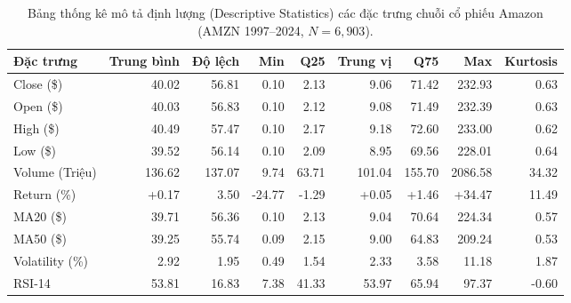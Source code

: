 \documentclass[12pt,a4paper]{report}
\begin{document}
\begin{table}[H]
\centering
\small
\caption{Bảng thống kê mô tả định lượng (Descriptive Statistics) các đặc trưng chuỗi cổ phiếu Amazon (AMZN 1997--2024, $N=6,903$).}
\label{tab:amazon_stats}
\begin{tabularx}{\textwidth}{lrrrrrrrr}
\toprule
\textbf{Đặc trưng} & \textbf{Trung bình} & \textbf{Độ lệch} & \textbf{Min} & \textbf{Q25} & \textbf{Trung vị} & \textbf{Q75} & \textbf{Max} & \textbf{Kurtosis} \\
\midrule
Close (\$) & 40.02 & 56.81 & 0.10 & 2.13 & 9.06 & 71.42 & 232.93 & 0.63 \\
Open (\$) & 40.03 & 56.83 & 0.10 & 2.12 & 9.08 & 71.49 & 232.39 & 0.63 \\
High (\$) & 40.49 & 57.47 & 0.10 & 2.17 & 9.18 & 72.60 & 233.00 & 0.62 \\
Low (\$) & 39.52 & 56.14 & 0.10 & 2.09 & 8.95 & 69.56 & 228.01 & 0.64 \\
Volume (Triệu) & 136.62 & 137.07 & 9.74 & 63.71 & 101.04 & 155.70 & 2086.58 & 34.32 \\
Return (\%) & +0.17 & 3.50 & -24.77 & -1.29 & +0.05 & +1.46 & +34.47 & 11.49 \\
MA20 (\$) & 39.71 & 56.36 & 0.10 & 2.13 & 9.04 & 70.64 & 224.34 & 0.57 \\
MA50 (\$) & 39.25 & 55.74 & 0.09 & 2.15 & 9.00 & 64.83 & 209.24 & 0.53 \\
Volatility (\%) & 2.92 & 1.95 & 0.49 & 1.54 & 2.33 & 3.58 & 11.18 & 1.87 \\
RSI-14 & 53.81 & 16.83 & 7.38 & 41.33 & 53.97 & 65.94 & 97.37 & -0.60 \\
\bottomrule
\end{tabularx}
\end{table}
\end{document}
